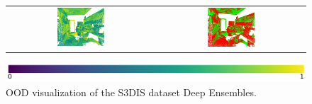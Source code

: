 \begin{figure}[h!]
\begin{tabular}{cc}
            \includegraphics[width=0.33\textwidth, height=0.18\textheight]{images/ood_imgs/de_s3dis/ofc_42_de_prob.pdf}& 
            \includegraphics[width=0.33\textwidth, height=0.18\textheight]{images/ood_imgs/de_s3dis/de_prob_1.pdf}\\
        \end{tabular}
        \includegraphics[scale=0.45]{images/prob_legend.pdf}
        \caption{OOD visualization of the S3DIS dataset Deep Ensembles.}
        \label{fig:de_s3dis_oodmap_prob}
    \end{figure}
